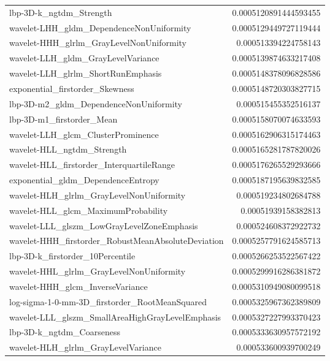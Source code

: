 {\begin{xltabular}[H]{\textwidth}{X r}
        lbp-3D-k\_ngtdm\_Strength & 0.0005120891444593455 \\
        wavelet-LHH\_gldm\_DependenceNonUniformity & 0.0005129449727119444 \\
        wavelet-HHH\_glrlm\_GrayLevelNonUniformity & 0.000513394224758143 \\
        wavelet-LLH\_gldm\_GrayLevelVariance & 0.0005139874633217408 \\
        wavelet-LLH\_glrlm\_ShortRunEmphasis & 0.0005148378096828586 \\
        exponential\_firstorder\_Skewness & 0.0005148720303827715 \\
        lbp-3D-m2\_gldm\_DependenceNonUniformity & 0.000515455352516137 \\
        lbp-3D-m1\_firstorder\_Mean & 0.0005158070074633593 \\
        wavelet-LLH\_glcm\_ClusterProminence & 0.0005162906315174463 \\
        wavelet-HLL\_ngtdm\_Strength & 0.0005165281787820026 \\
        wavelet-HLL\_firstorder\_InterquartileRange & 0.0005176265529293666 \\
        exponential\_gldm\_DependenceEntropy & 0.0005187195639832585 \\
        wavelet-HLH\_glrlm\_GrayLevelNonUniformity & 0.000519234802684788 \\
        wavelet-HLL\_glcm\_MaximumProbability & 0.00051939158382813 \\
        wavelet-LLL\_glszm\_LowGrayLevelZoneEmphasis & 0.000524608372922732 \\
        wavelet-HHH\_firstorder\_RobustMeanAbsoluteDeviation & 0.0005257791624585713 \\
        lbp-3D-k\_firstorder\_10Percentile & 0.0005266253522567422 \\
        wavelet-HHL\_glrlm\_GrayLevelNonUniformity & 0.0005299916286381872 \\
        wavelet-HHH\_glcm\_InverseVariance & 0.0005310949080099518 \\
        log-sigma-1-0-mm-3D\_firstorder\_RootMeanSquared & 0.0005325967362389809 \\
        wavelet-LLL\_glszm\_SmallAreaHighGrayLevelEmphasis & 0.0005327227993370423 \\
        lbp-3D-k\_ngtdm\_Coarseness & 0.0005333630957572192 \\
        wavelet-HLH\_glrlm\_GrayLevelVariance & 0.000533600939700249 \\

\end{xltabular}}
